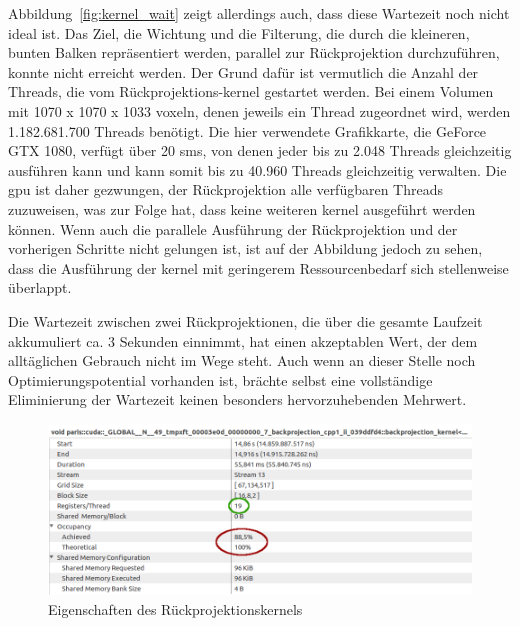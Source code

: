 Abbildung~\ref{fig:kernel_wait} zeigt allerdings auch, dass diese Wartezeit noch nicht ideal ist. Das Ziel, die Wichtung
und die Filterung, die durch die kleineren, bunten Balken repräsentiert werden, parallel zur Rückprojektion
durchzuführen, konnte nicht erreicht werden. Der Grund dafür ist vermutlich die Anzahl der Threads, die vom
Rückprojektions-\gls{kernel} gestartet werden. Bei einem Volumen mit 1070 x 1070 x 1033 \gls{voxel}n, denen jeweils ein
Thread zugeordnet wird, werden 1.182.681.700 Threads benötigt. Die hier verwendete Grafikkarte, die
GeForce{\textregistered} GTX 1080, verfügt über 20 \gls{sm}s, von denen jeder bis zu 2.048 Threads gleichzeitig
ausführen kann und kann somit bis zu 40.960 Threads gleichzeitig verwalten. Die \gls{gpu} ist daher gezwungen, der
Rückprojektion alle verfügbaren Threads zuzuweisen, was zur Folge hat, dass keine weiteren \gls{kernel} ausgeführt
werden können. Wenn auch die parallele Ausführung der Rückprojektion und der vorherigen Schritte nicht gelungen ist, ist
auf der Abbildung jedoch zu sehen, dass die Ausführung der \gls{kernel} mit geringerem Ressourcenbedarf sich
stellenweise überlappt.

Die Wartezeit zwischen zwei Rückprojektionen, die über die gesamte Laufzeit akkumuliert ca. 3 Sekunden einnimmt, hat
einen akzeptablen Wert, der dem alltäglichen Gebrauch nicht im Wege steht. Auch wenn an dieser Stelle noch
Optimierungspotential vorhanden ist, brächte selbst eine vollständige Eliminierung der Wartezeit keinen besonders
hervorzuhebenden Mehrwert.

\begin{figure}
    \includegraphics[width=\linewidth]{img/kernel_properties}
    \caption{Eigenschaften des Rückprojektionskernels}
    \label{fig:kernel_props}
\end{figure}

